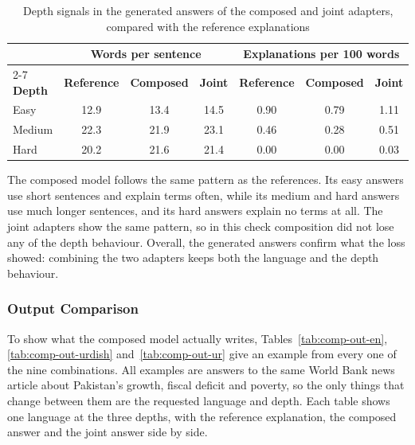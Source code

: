 \documentclass{FastFyp}
\begin{document}
\begin{table}[H]
\centering
\caption{Depth signals in the generated answers of the composed and joint adapters, compared with the reference explanations}
\label{tab:comp-depth}
\small
\begin{tabular}{|l|c|c|c|c|c|c|}
\hline
 & \multicolumn{3}{c|}{\textbf{Words per sentence}} & \multicolumn{3}{c|}{\textbf{Explanations per 100 words}} \\ \cline{2-7}
\textbf{Depth} & \textbf{Reference} & \textbf{Composed} & \textbf{Joint} & \textbf{Reference} & \textbf{Composed} & \textbf{Joint} \\ \hline
Easy   & 12.9 & 13.4 & 14.5 & 0.90 & 0.79 & 1.11 \\ \hline
Medium & 22.3 & 21.9 & 23.1 & 0.46 & 0.28 & 0.51 \\ \hline
Hard   & 20.2 & 21.6 & 21.4 & 0.00 & 0.00 & 0.03 \\ \hline
\end{tabular}
\end{table}

The composed model follows the same pattern as the references. Its easy answers use short sentences and explain terms often, while its medium and hard answers use much longer sentences, and its hard answers explain no terms at all. The joint adapters show the same pattern, so in this check composition did not lose any of the depth behaviour. Overall, the generated answers confirm what the loss showed: combining the two adapters keeps both the language and the depth behaviour.


\subsubsection{Output Comparison}
To show what the composed model actually writes, Tables~\ref{tab:comp-out-en}, \ref{tab:comp-out-urdish} and~\ref{tab:comp-out-ur} give an example from every one of the nine combinations. All examples are answers to the same World Bank news article about Pakistan's growth, fiscal deficit and poverty, so the only things that change between them are the requested language and depth. Each table shows one language at the three depths, with the reference explanation, the composed answer and the joint answer side by side. 
\end{document}
